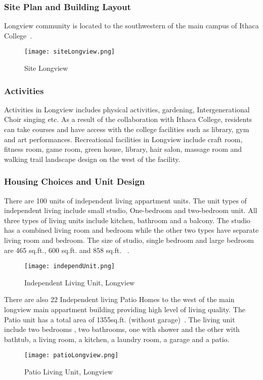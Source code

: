 \subsubsection{Site Plan and Building Layout}
Longview community is located to the southwestern of the main campus
of Ithaca College~\cite{googleMapLongiew}.
\begin{figure}[htbp]
  \centering
  \texttt{[image: siteLongview.png]}
  \caption[Site, Longview]{Site Longview~\cite{googleMapLongiew}}
  \label{fig:siteLongview}
\end{figure}

\subsubsection{Activities}
Activities in Longview includes physical activities, gardening,
Intergenerational Choir singing etc. As a result of the collaboration
with Ithaca College, residents can take courses and have access with
the college facilities such as library, gym and art
performances. Recreational facilities in Longview include craft room,
fitness room, game room, green house, library, hair salon, massage
room and walking trail landscape design on the west of the facility.

\subsubsection{Housing Choices and Unit Design}
There are 100 units of independent living appartment units. The unit
types of independent living include small studio, One-bedroom and
two-bedroom unit. All three types of living units include kitchen,
bathroom and a balcony. The studio has a combined living room and
bedroom while the other two types have separate living room and
bedroom. The size of studio, single bedroom and large bedroom are 465
sq.ft., 600 sq.ft. and 858 sq.ft. ~\cite{LongviewIndepend}. 
\begin{figure}[htbp]
  \centering
  \texttt{[image: independUnit.png]}
  \caption[Independent Living Unit, Longview]{Independent Living
    Unit, Longview~\cite{LongviewIndepend}}
  \label{fig:independUnit}
\end{figure}

There are also 22 Independent living Patio Homes to the west of the
main longview main appartment building providing high level of living
quality. The Patio unit has a total area of 1355sq.ft. (without
garage)~\cite{LongviewPatio}. The living unit include two bedrooms ,
two bathrooms, one with shower and the other with bathtub, a living
room, a kitchen, a laundry room, a garage and a patio.
\begin{figure}[htbp]
  \centering
  \texttt{[image: patioLongview.png]}
  \caption[Patio Living Unit, Longview]{Patio Living
    Unit, Longview~\cite{patioLongview}}
  \label{fig:patioLongview}
\end{figure}

